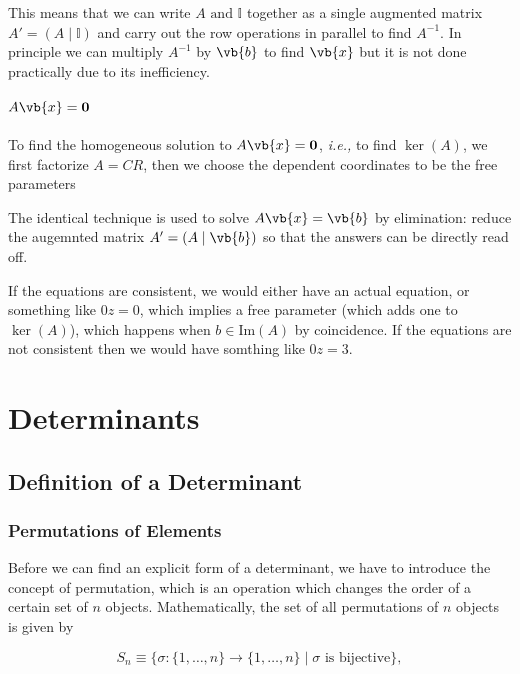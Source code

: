 \documentclass[a4paper,12pt]{report}
\begin{document}
This means that we can write \(A \text { and }  \mathbb{I}\) together as a single augmented matrix \(A'=(A \mid \mathbb{I})\) and carry out the row operations in parallel to find \(A^{-1} \).  In principle we can multiply \(A^{-1} \) by \(\vb{b} \) to find \(\vb{x} \) but it is not done practically due to its inefficiency. 

\subsubsection{\(A\vb{x} = \boldsymbol{0} \) }

To find the homogeneous solution to \(A\vb{x} = \boldsymbol{0} \), \textit{i.e.,} to find \(\ker (A)\), we first factorize \(A = CR\), then we choose the dependent coordinates to be the free parameters 



The identical technique is used to solve \(A\vb{x} =\vb{b} \) by elimination: reduce the augemnted matrix \(A' = (A \mid \vb{b} )\) so that the answers can be directly read off.  

If the equations are consistent, we would either have an actual equation, or something like \(0z=0\), which implies a free parameter (which adds one to \(\ker (A)\)), which happens when \(b \in \text{Im}(A)\) by coincidence. If the equations are not consistent then we would have somthing like \(0z=3\). 

\chapter{Determinants}

\section{Definition of a Determinant}

\subsection{Permutations of Elements}

Before we can find an explicit form of a determinant, we have to introduce the concept of permutation, which is an operation which changes the order of a certain set of \(n\) objects. Mathematically, the set of all permutations of \(n\) objects is given by 

\begin{equation}
    S_{n} \equiv \{\sigma : \{1,\ldots ,n\} \rightarrow \{1,\ldots ,n\} \mid  \sigma \text{ is bijective} \}, 
\end{equation}
\end{document}
